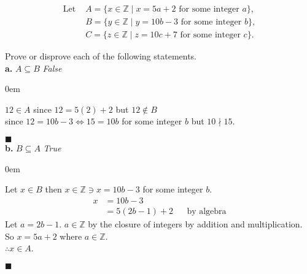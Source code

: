 \documentclass[12pt]{article}
\newcommand{\Z}{\mathbb{Z}}
\renewcommand{\qed}{\hfill$\blacksquare$}
\renewenvironment{proof}{\begin{addmargin}[1em]{0em}\begin{newproof}}{\end{newproof}\end{addmargin}\qed}
\begin{document}


\begin{tcolorbox}[width=\textwidth, title={Problem 6a \& 6b}, colback=white]
	\begin{center}
		\begin{tcolorbox}[width=.675\textwidth, colback=white, frame empty, boxrule=0pt]
			\setlength{\abovedisplayskip}{0pt}
			\setlength{\belowdisplayskip}{0pt}
			\begin{align*}
				\text{Let } & A = \{x \in \Z \mid x = 5a + 2 \text{ for some integer } a\},  \\
				            & B = \{y \in \Z \mid y = 10b - 3 \text{ for some integer } b\}, \\
				            & C = \{z \in \Z \mid z = 10c + 7 \text{ for some integer } c\}.
			\end{align*}
		\end{tcolorbox}
	\end{center}
	Prove or disprove each of the following statements. \\
	\textbf{a.} $A \subseteq B$ \textit{False} \\
	\begin{proof}[Disproof]
		$12 \in A$ since $12 = 5(2) + 2$ but $12\notin B$ \\
		since $12=10b-3 \iff 15 = 10b$ for some integer $b$ but $ 10 \nmid 15$.
	\end{proof} \\
	\textbf{b.} $B \subseteq A$ \textit{True} \\
	\begin{proof}
		Let $x\in B$ then $x\in \Z \ni x = 10b-3$ for some integer $b$.
		\begin{align*}
			x & = 10b -3                            \\
			  & = 5(2b-1) +2 &  & \text{by algebra}
		\end{align*}
		Let $a = 2b - 1$. $a \in \Z$ by the closure of integers by addition and multiplication. \\
		So $x = 5a+2$ where $a \in \Z$. \\
		$\therefore x \in A$.
	\end{proof}
\end{tcolorbox}
\end{document}
